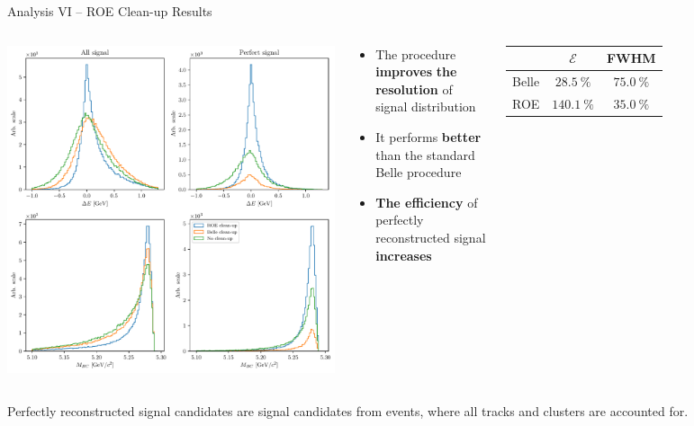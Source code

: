 \documentclass[serif]{beamer}
\begin{document}
\begin{frame}[t]{Analysis VI -- ROE Clean-up Results}
\vspace{-3mm}
\small

\begin{columns}
	\includegraphics[width=\textwidth]{fig/roe_opt}
	\begin{block}{}
		\begin{itemize}
			\item The procedure \textbf{improves} \textbf{the resolution} of signal distribution
			\item It performs \textbf{better} than the standard Belle procedure
			\item \textbf{The efficiency} of perfectly reconstructed signal \textbf{increases}
		\end{itemize}
	\end{block}
	\begin{table}[H]
		\centering
		\begin{tabular}{c|c|c}
			& $\mathcal{E}$ & FWHM\\
			\toprule
			Belle & $28.5~\%$  & $75.0~\%$  \\
			ROE & $140.1~\%$ & $35.0~\%$ \\
			\bottomrule
		\end{tabular}
	\end{table}
\end{columns}

{\footnotesize Perfectly reconstructed signal candidates are signal candidates from events, where all tracks and clusters are accounted for.}


\end{frame}
\end{document}
